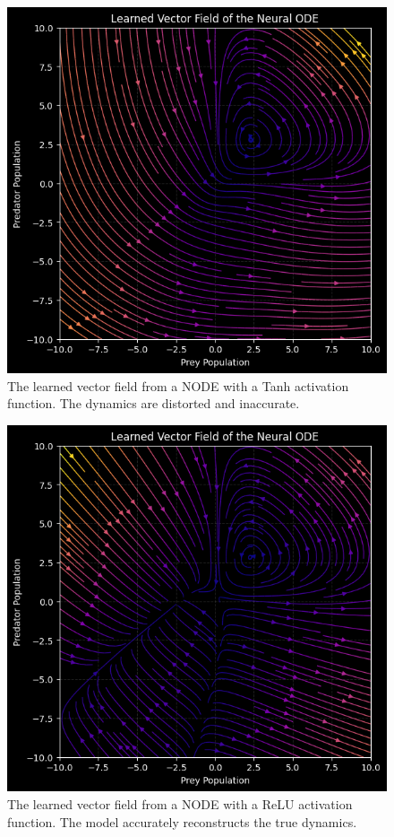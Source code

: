 \begin{figure}[h!]
  \centering
  \includegraphics[width=0.8\linewidth]{figures/lv_tanh.png}
  \caption{The learned vector field from a NODE with a Tanh activation function. 
  The dynamics are distorted and inaccurate.}
  \label{fig:lv_tanh}
\end{figure}

\begin{figure}[h!]
  \centering
  \includegraphics[width=0.8\linewidth]{figures/lv_relu.png}
  \caption{The learned vector field from a NODE with a ReLU activation function. 
  The model accurately reconstructs the true dynamics.}
  \label{fig:lv_relu}
\end{figure}